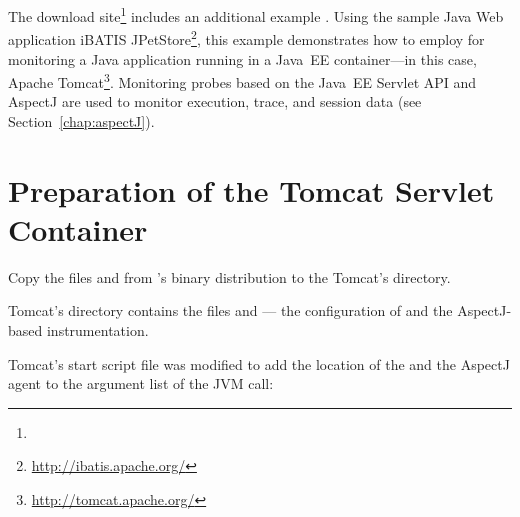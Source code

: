 The \Kieker{} download site\footnote{\KiekerDownloadURL{}} includes an additional %
example \file{\JavaEEServletExampleName}. Using the sample Java Web application %
iBATIS JPetStore\footnote{\url{http://ibatis.apache.org/}}, this example %
demonstrates how to employ \KiekerMonitoringPart{} for monitoring a Java application %
running in a Java~EE container---in this case, Apache Tomcat\footnote{\url{http://tomcat.apache.org/}}. %
Monitoring probes based on the Java~EE Servlet API %
and AspectJ are used to monitor execution, trace, and session data (see Section~\ref{chap:aspectJ}).

\section{Preparation of the Tomcat Servlet Container}


\begin{compactenum}
\item Copy the files \file{\mainJar} and \file{\aspectJWeaverJar} from %
\Kieker{}'s binary distribution to the Tomcat's  directory.
\item Tomcat's  directory contains the files  %
and  --- the configuration of \KiekerMonitoringPart{} and the %
AspectJ-based instrumentation. %
\item
 Tomcat's start script  file was modified to add the location %
of the  and the AspectJ agent to the argument %
list of the JVM call:
\end{compactenum}

\enlargethispage{1cm}

% 
% 
% 



